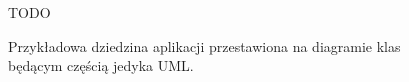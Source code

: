 \begin{figure}[!ht]
TODO

\caption{Przykładowa dziedzina aplikacji przestawiona na diagramie klas będącym częścią jedyka UML.}
\label{fig:implementation_core:uml}
\end{figure}
